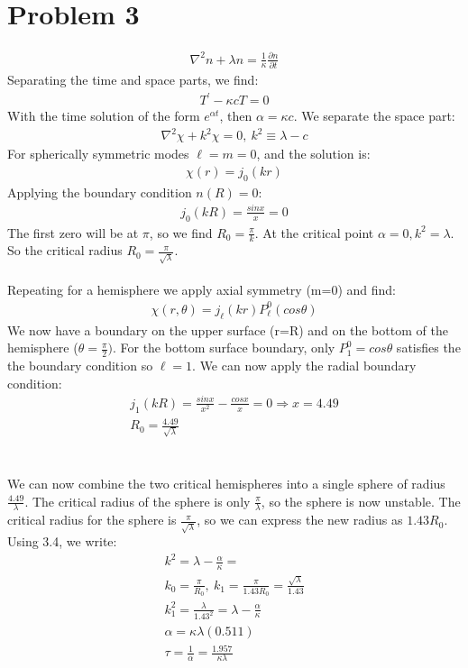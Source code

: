 \documentclass[a4paper,10pt]{article}
\numberwithin{equation}{section}
\begin{document}
\section{Problem 3}
\begin{gather}
 \nabla^2n+\lambda n=\frac{1}{\kappa}\frac{\partial n}{\partial t}
\end{gather}
Separating the time and space parts, we find:
\begin{gather}
 T^{'}-\kappa cT=0
\end{gather}
With the time solution of the form $e^{\alpha t}$, then $\alpha=\kappa c$.
We separate the space part:
\begin{gather}
 \nabla ^2 \chi + k^2 \chi = 0,\ k^2 \equiv \lambda-c
\end{gather}
For spherically symmetric modes $\ell=m=0$, and the solution is:
\begin{gather}
 \chi(r)=j_0(kr)
\end{gather}
Applying the boundary condition $n(R)=0$:
\begin{gather}
 j_0(kR)=\frac{sinx}{x}=0
\end{gather}
The first zero will be at $\pi$, so we find $R_0=\frac{\pi}{k}$.
At the critical point $\alpha=0,k^2=\lambda$. 
So the critical radius $R_0=\frac{\pi}{\sqrt{\lambda}}$. \\ \\
Repeating for a hemisphere we apply axial symmetry (m=0) and find:
\begin{gather}
 \chi(r,\theta )=j_{\ell}(kr)P_{\ell}^{0}(cos \theta )
\end{gather}
We now have a boundary on the upper surface (r=R) and on the bottom of the hemisphere ($\theta=\frac{\pi}{2})$.
For the bottom surface boundary, only $P_{1}^{0}=cos\theta$ satisfies the the boundary condition so $\ell=1$.
We can now apply the radial boundary condition:
\begin{gather}
 j_1(kR)=\frac{sinx}{x^2}-\frac{cosx}{x}=0 \Rightarrow x=4.49\\
 R_0=\frac{4.49}{\sqrt{\lambda}}
\end{gather}
\\ \\
We can now combine the two critical hemispheres into a single sphere of radius $\frac{4.49}{\lambda}$. 
The critical radius of the sphere is only $\frac{\pi}{\lambda}$, so the sphere is now unstable.
The critical radius for the sphere is $\frac{\pi}{\sqrt{\lambda}}$, so we can express the new radius as $1.43R_0$. 
Using 3.4, we write:
\begin{gather}
 k^2=\lambda-\frac{\alpha}{\kappa}=\\
 k_0=\frac{\pi}{R_0},\ k_1=\frac{\pi}{1.43R_0}=\frac{\sqrt{\lambda}}{1.43}\\
 k_1^2=\frac{\lambda}{1.43^2}=\lambda-\frac{\alpha}{\kappa}\\
 \alpha=\kappa\lambda(0.511)\\
 \tau = \frac{1}{\alpha}=\frac{1.957}{\kappa \lambda}
\end{gather}
\end{document}
